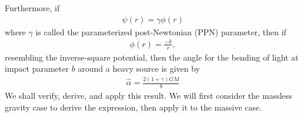\documentclass{book}
\theoremstyle{definition}
\newcommand{\f}[2]{\frac{#1}{#2}}
\begin{document}
Furthermore, if 
\begin{align}
\psi(r) = \gamma\phi(r)
\end{align} 
where $\gamma$ is called the parameterized post-Newtonian (PPN) parameter, then if 
\begin{align}
\phi(r) = \f{-k}{r},
\end{align}
resembling the inverse-square potential, then the angle for the bending of light at impact parameter $b$ around a heavy source is given by
\begin{align}\label{light}
\boxed{\hat{\alpha} = \f{2(1+\gamma)GM}{b}}
\end{align}
We shall verify, derive, and apply this result. We will first consider the massless gravity case to derive the expression, then apply it to the massive case.\\
\end{document}
